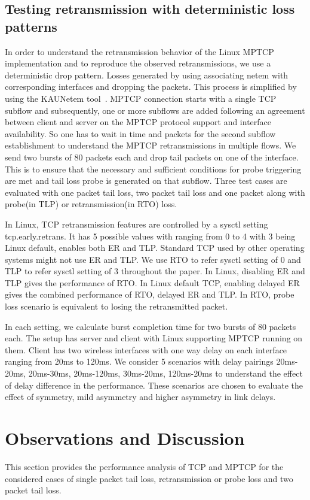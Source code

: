 \documentclass[10pt,draftcls,twocolumn]{IEEEconf}
\begin{document}
\subsection{Testing retransmission with deterministic loss patterns}
In order to understand the retransmission behavior of the Linux MPTCP implementation and to reproduce the observed retransmissions, we use a deterministic drop pattern.
Losses generated by using associating netem with corresponding interfaces and dropping the packets. This process is simplified by using the KAUNetem tool~\cite{Garcia2016}. 
MPTCP connection starts with a single TCP subflow and subsequently, one or more subflows are added following an agreement between client and server on the MPTCP protocol 
support and interface availability. So one has to wait in time and packets for the second subflow establishment to understand the MPTCP retransmissions in multiple flows. We send two bursts of 80 
packets each and drop tail packets on one of the interface. This is to ensure that the necessary and sufficient conditions for probe triggering are met and tail loss probe is generated on that
subflow. Three test cases are evaluated with one packet tail loss, two packet tail loss and one packet along with probe(in TLP) or retransmission(in RTO) loss. 

In Linux, TCP retransmission features are controlled by a sysctl setting tcp.early.retrans. It has 5 possible values with ranging from 0 to 4 with 3 being Linux default, enables both
ER and TLP. Standard TCP used by other operating systems might not use ER and TLP. We use RTO to refer sysctl setting of 0 and TLP to refer sysctl setting of 3 throughout the paper.
In Linux, disabling ER and TLP gives the performance of RTO. In Linux default TCP, enabling delayed ER gives the combined performance of RTO, delayed ER and TLP.
In RTO, probe loss scenario is equivalent to losing the retransmitted packet.

In each setting, we calculate burst completion time for two bursts of 80 packets each. The setup has server and client with Linux supporting MPTCP running on them. Client has two wireless 
interfaces with one way delay on each interface ranging from 20ms to 120ms. We consider 5 scenarios with delay pairings 20ms-20ms, 20ms-30ms, 20ms-120ms, 30ms-20ms, 120ms-20ms to understand 
the effect of delay difference in the performance. These scenarios are chosen to evaluate the effect of symmetry, mild asymmetry and higher asymmetry in link delays. 

\section{Observations and Discussion}\label{disc}
This section provides the performance analysis of TCP and MPTCP for the considered cases of single packet tail loss, retransmission or probe loss and two packet 
tail loss.
\end{document}
